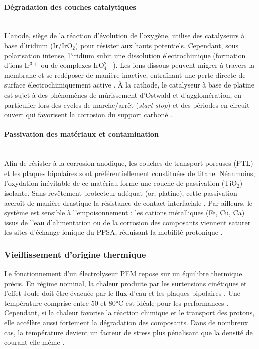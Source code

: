 \paragraph{Dégradation des couches catalytiques}\hfill \\
L'anode, siège de la réaction d'évolution de l'oxygène, utilise des catalyseurs à base d'iridium (Ir/IrO$_2$) pour résister aux hauts potentiels. Cependant, sous polarisation intense, l'iridium subit une dissolution électrochimique (formation d'ions Ir$^{3+}$ ou de complexes IrO$_4^{2-}$). Les ions dissous peuvent migrer à travers la membrane et se redéposer de manière inactive, entraînant une perte directe de surface électrochimiquement active \cite{cherevko_oxygen_2016}\cite{papakonstantinou_degradation_2020}.
À la cathode, le catalyseur à base de platine est sujet à des phénomènes de mûrissement d'Ostwald  et d'agglomération, en particulier lors des cycles de marche/arrêt (\textit{start-stop}) et des périodes en circuit ouvert qui favorisent la corrosion du support carboné \cite{dodwell_open-circuit_2021}\cite{rakousky_analysis_2016}.

\paragraph{Passivation des matériaux et contamination}\hfill \\
Afin de résister à la corrosion anodique, les couches de transport poreuses (PTL) et les plaques bipolaires sont préférentiellement constituées de titane. Néanmoins, l'oxydation inévitable de ce matériau forme une couche de passivation (TiO$_2$) isolante. Sans revêtement protecteur adéquat (or, platine), cette passivation accroît de manière drastique la résistance de contact interfaciale  \cite{bystron_enhancing_2018}\cite{prestat_corrosion_2023}. Par ailleurs, le système est sensible à l'empoisonnement : les cations métalliques (Fe, Cu, Ca) issus de l'eau d'alimentation ou de la corrosion des composants viennent saturer les sites d'échange ionique du PFSA, réduisant la mobilité protonique \cite{li_effect_2019}.

\subsubsection{Vieillissement d'origine thermique} 

Le fonctionnement d'un électrolyseur PEM repose sur un équilibre thermique précis. En régime nominal, la chaleur produite par les surtensions cinétiques et l'effet Joule doit être évacuée par le flux d'eau et les plaques bipolaires \cite{wang_proton_2025}. Une température comprise entre 50 et 80°C est idéale pour les performances \cite{bonanno_review_2024}. Cependant, si la chaleur favorise la réaction chimique et le transport des protons, elle accélère aussi fortement la dégradation des composants. Dans de nombreux cas, la température devient un facteur de stress plus pénalisant que la densité de courant elle-même \cite{urbano_accelerated_2024}. 

